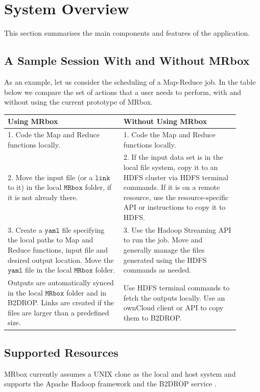 \section{System Overview}
This section summarises the main components and features of the application.

\subsection{A Sample Session With and Without MRbox}
As an example, let us consider the scheduling of a Map-Reduce job. In the table below we compare the set of actions that a user needs to perform, with and without using the current prototype of MRbox.

\vspace{.5em}\noindent
\begin{tabular}{p{0.45\linewidth}|p{0.45\linewidth}}
    \textbf{Using MRbox} & \textbf{Without Using MRbox} \\
    \hline
        1. Code the Map and Reduce functions locally. & 1. Code the Map and Reduce functions locally.\\ 
        2. Move the input file (or a $\texttt{link}$ to it) in the local $\texttt{MRbox}$ folder, if it is not already there. & 2. If the input data set is in the local file system, copy it to an HDFS cluster via HDFS terminal commands. If it is on a remote resource, use the resource-specific API or instructions to copy it to HDFS. \\ 
        3. Create a $\texttt{yaml}$ file specifying the local paths to Map and Reduce functions, input file and desired output location. Move the $\texttt{yaml}$ file in the local $\texttt{MRbox}$ folder. & 3. Use the Hadoop Streaming API to run the job. Move and generally manage the files generated using the HDFS commands as needed. \\
    \hline
        Outputs are automatically synced in the local $\texttt{MRbox}$ folder and in B2DROP. Links are created if the files are larger than a predefined size. & Use HDFS terminal commands to fetch the outputs locally. Use an ownCloud client or API to copy them to B2DROP. \\
\end{tabular}

\subsection{Supported Resources}
MRbox currently assumes a UNIX clone as the local and host system and supports the Apache Hadoop framework \cite{hadoop} and the B2DROP service \cite{b2drop}.

